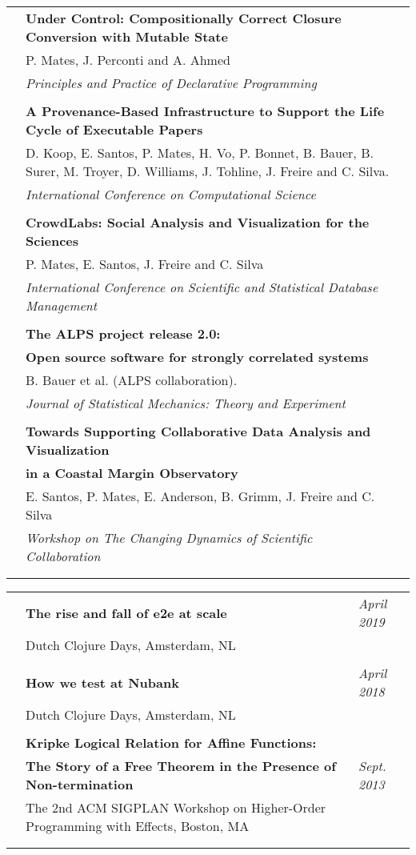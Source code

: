 \documentclass[10pt]{article}
\makeatletter
\newcommand{\category}[2]{
\begin{center}
\vskip 6pt
\begin{tabular*}{\textwidth}{@{}p{0.75in}@{\quad\;\;}p{4in}@{\quad\quad}p{0.7in}}
\vcrush[t]{1in}{\textsc{#1}} &
#2
\end{tabular*}
\end{center}
}
\newcommand{\categoryB}[2]{
\begin{center}
\vskip 6pt
\begin{tabular*}{\textwidth}{@{}p{0.75in}@{\quad\;\;}p{4.4in}@{\quad\quad}p{0.3in}}
\vcrush[t]{1in}{\textsc{#1}} &
#2
\end{tabular*}
\end{center}
}
\newcommand{\n}{\\ & }
\newcommand{\nn}{\\ \n}
\newcommand{\DT}[1]{&\hspace{\stretch 1}\textit{#1}}
\newcommand{\conf}[1]{&\hspace{\stretch 1}\crushr{\textit{#1}}}
\makeatother
\begin{document}
{%

}


\categoryB{Publications}
{
{\bf Under Control: Compositionally Correct Closure Conversion with Mutable State} \conf{\mbox{PPDP 2019}}\n
P. Mates, J. Perconti and A. Ahmed\n
{\em Principles and Practice of Declarative Programming}\nn

{\bf A Provenance-Based Infrastructure to Support the Life Cycle of Executable Papers} \conf{\mbox{ICCS 2011}}\n
D. Koop, E. Santos, P. Mates, H. Vo, P. Bonnet, B. Bauer, B. Surer, M. Troyer, D. Williams, J. Tohline, J. Freire and C. Silva.\n
{\em International Conference on Computational Science}\nn

{\bf CrowdLabs: Social Analysis and Visualization for the Sciences} \conf{\mbox{SSDBM 2011}}\n
P. Mates, E. Santos, J. Freire and C. Silva\n
{\em International Conference on Scientific and Statistical Database Management}\nn

{\bf The ALPS project release 2.0:}\n
{\bf Open source software for strongly correlated systems} \conf{\mbox{JSTAT 2011}}\n
B. Bauer et al. (ALPS collaboration).\n
{\em Journal of Statistical Mechanics: Theory and Experiment}\nn

{\bf Towards Supporting Collaborative Data Analysis and Visualization}\n
{\bf in a Coastal Margin Observatory} \conf{\mbox{CSCW 2010}}\n
E. Santos, P. Mates, E. Anderson, B. Grimm, J. Freire and C. Silva\n
{\em Workshop on The Changing Dynamics of Scientific Collaboration}\nn
}
\vspace{-3em}
\category{Talks}{
{\bf The rise and fall of e2e at scale} \DT{April 2019}\n
Dutch Clojure Days, Amsterdam, NL\nn
{\bf How we test at Nubank} \DT{April 2018}\n
Dutch Clojure Days, Amsterdam, NL\nn
{\bf  Kripke Logical Relation for Affine Functions:}\n
{\bf The Story of a Free Theorem in the Presence of Non-termination} \DT{Sept. 2013}\n
The 2nd ACM SIGPLAN Workshop on Higher-Order Programming with Effects, Boston, MA\nn
}
\vspace{-3em}
\end{document}
